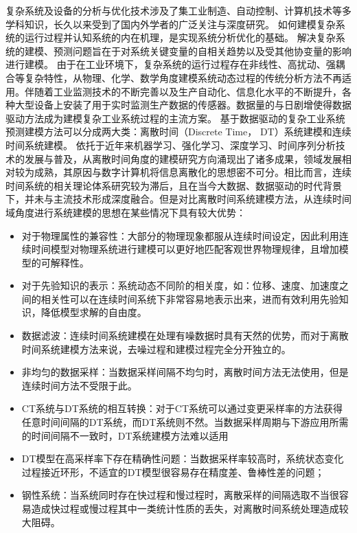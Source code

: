 复杂系统及设备的分析与优化技术涉及了集工业制造、自动控制、计算机技术等多学科知识，长久以来受到了国内外学者的广泛关注与深度研究。
如何建模复杂系统的运行过程并认知系统的内在机理，是实现系统分析优化的基础。
解决复杂系统的建模、预测问题旨在于对系统关键变量的自相关趋势以及受其他协变量的影响进行建模。
由于在工业环境下，复杂系统的运行过程存在非线性、高扰动、强耦合等复杂特性，从物理、化学、数学角度建模系统动态过程的传统分析方法不再适用。伴随着工业监测技术的不断完善以及生产自动化、信息化水平的不断提升，各种大型设备上安装了用于实时监测生产数据的传感器。数据量的与日剧增使得数据驱动方法成为建模复杂工业系统过程的主流方案。
基于数据驱动的复杂工业系统预测建模方法可以分成两大类：离散时间（Discrete Time， DT）系统建模和连续时间系统建模。
依托于近年来机器学习、强化学习\cite{sutton2018reinforcement}、深度学习\cite{lecun2015deep}\cite{duan2016}、时间序列分析技术\cite{shumway2000time}的发展与普及，从离散时间角度的建模研究方向涌现出了诸多成果，领域发展相对较为成熟，其原因与数字计算机将信息离散化的思想密不可分。相比而言，连续时间系统的相关理论体系研究较为滞后，且在当今大数据、数据驱动的时代背景下，并未与主流技术形成深度融合。但是对比离散时间系统建模方法，从连续时间域角度进行系统建模的思想在某些情况下具有较大优势：
\begin{itemize}
\item	对于物理属性的兼容性：大部分的物理现象都服从连续时间设定，因此利用连续时间模型对物理系统进行建模可以更好地匹配客观世界物理规律，且增加模型的可解释性。
\item	对于先验知识的表示：系统动态不同阶的相关度，如：位移、速度、加速度之间的相关性可以在连续时间系统下非常容易地表示出来，进而有效利用先验知识，降低模型求解的自由度。
\item	数据滤波：连续时间系统建模在处理有噪数据时具有天然的优势，而对于离散时间系统建模方法来说，去噪过程和建模过程完全分开独立的。
\item	非均匀的数据采样：当数据采样间隔不均匀时，离散时间方法无法使用，但是连续时间方法不受限于此。
\item	CT系统与DT系统的相互转换：对于CT系统可以通过变更采样率的方法获得任意时间间隔的DT系统，而DT系统则不然。当数据采样周期与下游应用所需的时间间隔不一致时，DT系统建模方法难以适用
\item	DT模型在高采样率下存在精确性问题：当数据采样率较高时，系统状态变化过程接近环形，不适宜的DT模型很容易存在精度差、鲁棒性差的问题；
\item	钢性系统：当系统同时存在快过程和慢过程时，离散采样的间隔选取不当很容易造成快过程或慢过程其中一类统计性质的丢失，对离散时间系统处理造成较大阻碍。
\end{itemize}

